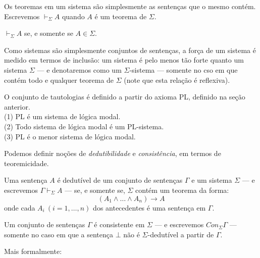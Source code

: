 Os teoremas em um sistema são simplesmente as sentenças que o mesmo contém.
Escrevemos $\vdash_{\Sigma} A$ quando $A$ é um teorema de $\Sigma$.

\begin{definition}
    $\vdash_{\Sigma} A$ se, e somente se $A \in \Sigma$.
\end{definition}

Como sistemas são simplesmente conjuntos de sentenças, a força de um sistema é medido em
termos de inclusão: um sistema é pelo menos tão forte quanto um sistema $\Sigma$
--- e denotaremos como um $\Sigma$-sistema --- somente no cso em que contém todo
e qualquer teorema de $\Sigma$ (note que esta relação é reflexiva).

\begin{theorem}
    O conjunto de tautologias é definido a partir do axioma PL, definido na
    seção anterior.\\
    (1) PL é um sistema de lógica modal. \\
    (2) Todo sistema de lógica modal é um PL-sistema. \\
    (3) PL é o menor sistema de lógica modal.
\end{theorem}

Podemos definir noções de \textit{dedutibilidade} e \textit{consistência}, em
termos de teoremicidade. 

Uma sentença $A$ é dedutível de um conjunto de
sentenças $\Gamma$ e um sistema $\Sigma$ --- e escrevemos $\Gamma
\vdash_{\Sigma} A$ --- se, e somente se, $\Sigma$ contém um teorema da forma:
\begin{equation}
    (A_1 \wedge \ldots \wedge A_n) \rightarrow A
\end{equation}
onde cada $A_i~(i=1,\ldots,n)$ dos antecedentes é uma sentença em $\Gamma$.

Um conjunto de sentenças $\Gamma$ é consistente em $\Sigma$ --- e escrevemos
$Con_{\Sigma}\Gamma$ --- somente no caso em que a sentença $\bot$ não é
$\Sigma$-dedutível a partir de $\Gamma$.

Mais formalmente:

\begin{definition}[Dedutibilidade]
    
\end{definition}

\begin{definition}[Consistência]
    
\end{definition}

